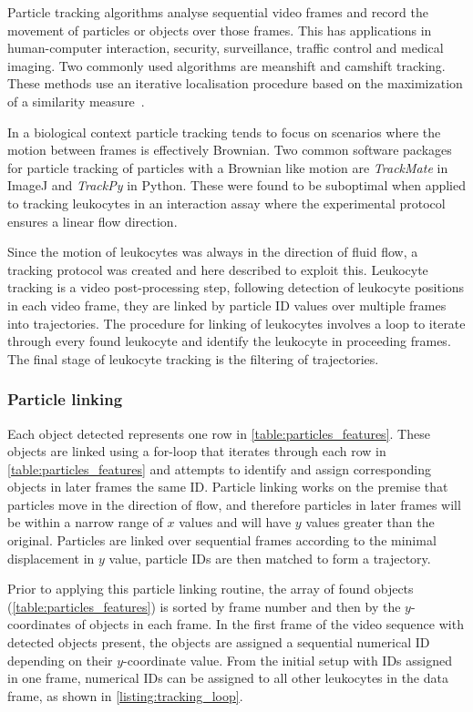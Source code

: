 Particle tracking algorithms analyse sequential video frames and record the movement of particles or objects over those frames. This has applications in human-computer interaction, security, surveillance, traffic control and medical imaging. Two commonly used algorithms are meanshift and camshift tracking. These methods use an iterative localisation procedure based on the maximization of a similarity measure~\cite{Comaniciu2000}.

In a biological context particle tracking tends to focus on scenarios where the motion between frames is effectively Brownian. Two common software packages for particle tracking of particles with a Brownian like motion are \emph{TrackMate} in ImageJ and \emph{TrackPy} in Python. These were found to be suboptimal when applied to tracking leukocytes in an interaction assay where the experimental protocol ensures a linear flow direction.

Since the motion of leukocytes was always in the direction of fluid flow, a tracking protocol was created and here described to exploit this. Leukocyte tracking is a video post-processing step, following detection of leukocyte positions in each video frame, they are linked by particle ID values over multiple frames into trajectories. The procedure for linking of leukocytes involves a loop to iterate through every found leukocyte and identify the leukocyte in proceeding frames. The final stage of leukocyte tracking is the filtering of trajectories.

\subsubsection{Particle linking}
Each object detected represents one row in \autoref{table:particles_features}. These objects are linked using a for-loop that iterates through each row in \autoref{table:particles_features} and attempts to identify and assign corresponding objects in later frames the same ID. Particle linking works on the premise that particles move in the direction of flow, and therefore particles in later frames will be within a narrow range of $x$ values and will have $y$ values greater than the original. Particles are linked over sequential frames according to the minimal displacement in $y$ value, particle IDs are then matched to form a trajectory.

Prior to applying this particle linking routine, the array of found objects (\autoref{table:particles_features}) is sorted by frame number and then by the $y$-coordinates of objects in each frame. In the first frame of the video sequence with detected objects present, the objects are assigned a sequential numerical ID depending on their $y$-coordinate value. From the initial setup with IDs assigned in one frame, numerical IDs can be assigned to all other leukocytes in the data frame, as shown in \autoref{listing:tracking_loop}. 

